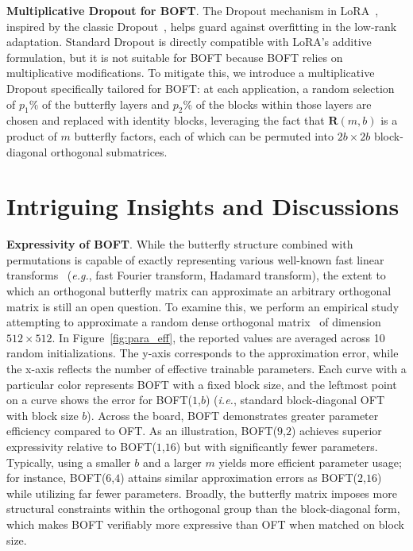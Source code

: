 \textbf{Multiplicative Dropout for BOFT}. The Dropout mechanism in LoRA~\cite{hulora2022}, inspired by the classic Dropout~\cite{srivastava2014dropout}, helps guard against overfitting in the low-rank adaptation. Standard Dropout is directly compatible with LoRA’s additive formulation, but it is not suitable for BOFT because BOFT relies on multiplicative modifications. To mitigate this, we introduce a multiplicative Dropout specifically tailored for BOFT: at each application, a random selection of $p_1\%$ of the butterfly layers and $p_2\%$ of the blocks within those layers are chosen and replaced with identity blocks, leveraging the fact that $\bm{R}(m,b)$ is a product of $m$ butterfly factors, each of which can be permuted into $2b \times 2b$ block-diagonal orthogonal submatrices.

\section{Intriguing Insights and Discussions}

\textbf{Expressivity of BOFT}. While the butterfly structure combined with permutations is capable of exactly representing various well-known fast linear transforms~\cite{dao2019learning,dao2019kaleidoscope} (\emph{e.g.}, fast Fourier transform, Hadamard transform), the extent to which an orthogonal butterfly matrix can approximate an arbitrary orthogonal matrix is still an open question. To examine this, we perform an empirical study attempting to approximate a random dense orthogonal matrix~\cite{anderson1987generation} of dimension $512\times 512$. In Figure~\ref{fig:para_eff}, the reported values are averaged across 10 random initializations. The y-axis corresponds to the approximation error, while the x-axis reflects the number of effective trainable parameters. Each curve with a particular color represents BOFT with a fixed block size, and the leftmost point on a curve shows the error for BOFT($1$,$b$) (\emph{i.e.}, standard block-diagonal OFT with block size $b$). Across the board, BOFT demonstrates greater parameter efficiency compared to OFT. As an illustration, BOFT($9$,$2$) achieves superior expressivity relative to BOFT($1$,$16$) but with significantly fewer parameters. Typically, using a smaller $b$ and a larger $m$ yields more efficient parameter usage; for instance, BOFT($6$,$4$) attains similar approximation errors as BOFT($2$,$16$) while utilizing far fewer parameters. Broadly, the butterfly matrix imposes more structural constraints within the orthogonal group than the block-diagonal form, which makes BOFT verifiably more expressive than OFT when matched on block size.

